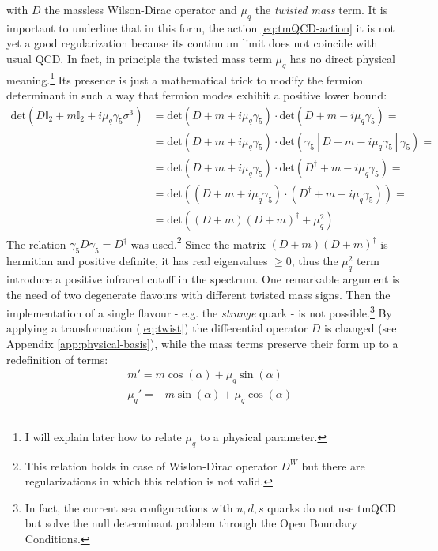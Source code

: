 \documentclass[english, LaM, oneside, noexaminfo]{sapthesis}
\newcommand{\obc}{Open Boundary Conditions}
\begin{document}
with $D$ the massless Wilson-Dirac operator and $\mu_q$ the {\it twisted mass} term.
It is important to underline that in this form, the action \ref{eq:tmQCD-action} it is not yet a good regularization because its continuum limit does not coincide with usual QCD.
In fact, in principle the twisted mass term $\mu_q$ has no direct physical meaning.\footnote{I will explain later how to relate $\mu_q$ to a physical parameter.}
Its presence is just a mathematical trick to modify the fermion determinant in such a way that fermion modes exhibit a positive lower bound:
\begin{equation*}
    \begin{aligned}
        \text{det}(D \mathbb{I}_2 + m \mathbb{I}_2 + i\mu_q\gamma_5\sigma^3) 
        & = \text{det}(D + m + i\mu_q\gamma_5) \cdot \text{det}(D + m - i\mu_q\gamma_5) = \\
        & = \text{det}(D + m + i\mu_q\gamma_5) \cdot \text{det}(\gamma_5[D + m - i\mu_q\gamma_5]\gamma_5) = \\
        & = \text{det}(D + m + i\mu_q\gamma_5) \cdot \text{det}(D^\dagger + m - i\mu_q\gamma_5) = \\
        & = \text{det}\left((D + m + i\mu_q\gamma_5)\cdot(D^\dagger + m - i\mu_q\gamma_5)\right) = \\
        & = \text{det}\left((D+m)(D+m)^\dagger + \mu_q^2\right)
    \end{aligned}
\end{equation*}
The relation $\gamma_5 D \gamma_5 = D^\dagger$ was used.\footnote{This relation holds in case of Wislon-Dirac operator $D^W$ but there are regularizations in which this relation is not valid.}
Since the matrix $(D+m)(D+m)^\dagger$ is hermitian and positive definite, it has real eigenvalues $\ge 0$, thus the $\mu_q^2$ term introduce a positive infrared cutoff in the spectrum.
One remarkable argument is the need of two degenerate flavours with different twisted mass signs.
Then the implementation of a single flavour - e.g. the {\it strange} quark - is not possible.\footnote{In fact, the current sea configurations with $u,d,s$ quarks do not use tmQCD but solve the null determinant problem through the \obc.}
\newline
By applying a transformation (\ref{eq:twist}) the differential operator $D$ is changed (see Appendix \ref{app:physical-basis}), while the mass terms preserve their form up to a redefinition of terms:
\begin{equation}\label{eq:new-masses}
    \begin{aligned}
        & m' = m \cos (\alpha) + \mu_q \sin (\alpha) \\
        & \mu_q' = - m \sin (\alpha) + \mu_q \cos (\alpha)
    \end{aligned}
\end{equation}
\end{document}

